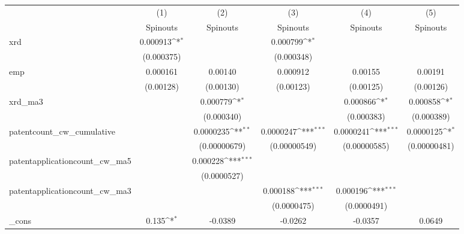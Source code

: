 {
\def\sym#1{\ifmmode^{#1}\else\(^{#1}\)\fi}
\begin{tabular}{l*{5}{c}}
\hline\hline
            &\multicolumn{1}{c}{(1)}&\multicolumn{1}{c}{(2)}&\multicolumn{1}{c}{(3)}&\multicolumn{1}{c}{(4)}&\multicolumn{1}{c}{(5)}\\
            &\multicolumn{1}{c}{Spinouts}&\multicolumn{1}{c}{Spinouts}&\multicolumn{1}{c}{Spinouts}&\multicolumn{1}{c}{Spinouts}&\multicolumn{1}{c}{Spinouts}\\
\hline
xrd         &    0.000913\sym{*}  &                     &    0.000799\sym{*}  &                     &                     \\
            &  (0.000375)         &                     &  (0.000348)         &                     &                     \\
[1em]
emp         &    0.000161         &     0.00140         &    0.000912         &     0.00155         &     0.00191         \\
            &   (0.00128)         &   (0.00130)         &   (0.00123)         &   (0.00125)         &   (0.00126)         \\
[1em]
xrd\_ma3     &                     &    0.000779\sym{*}  &                     &    0.000866\sym{*}  &    0.000858\sym{*}  \\
            &                     &  (0.000340)         &                     &  (0.000383)         &  (0.000389)         \\
[1em]
patentcount\_cw\_cumulative&                     &   0.0000235\sym{**} &   0.0000247\sym{***}&   0.0000241\sym{***}&   0.0000125\sym{*}  \\
            &                     &(0.00000679)         &(0.00000549)         &(0.00000585)         &(0.00000481)         \\
[1em]
patentapplicationcount\_cw\_ma5&                     &    0.000228\sym{***}&                     &                     &                     \\
            &                     & (0.0000527)         &                     &                     &                     \\
[1em]
patentapplicationcount\_cw\_ma3&                     &                     &    0.000188\sym{***}&    0.000196\sym{***}&                     \\
            &                     &                     & (0.0000475)         & (0.0000491)         &                     \\
[1em]
\_cons      &       0.135\sym{*}  &     -0.0389         &     -0.0262         &     -0.0357         &      0.0649         \\

\end{tabular}}
